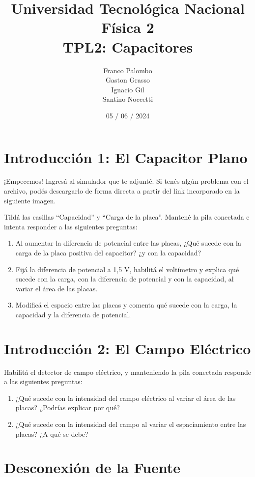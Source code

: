 \documentclass[12pt]{report}
\title{%
  \fontsize{25}{0}\selectfont Universidad Tecnológica Nacional \\
  \fontsize{22}{30}\selectfont Física 2 \\
  \fontsize{18}{25}\selectfont TPL2: Capacitores
}
\author{
  Franco Palombo\\
  Gaston Grasso\\
  Ignacio Gil\\
  Santino Noccetti\\
}
\date{05 / 06 / 2024}
\begin{document}
\maketitle

\section{Introducción 1: El Capacitor Plano}

¡Empecemos! Ingresá al simulador que te adjunté. Si tenés algún problema con el archivo, podés descargarlo de forma directa a partir del link incorporado en la siguiente imagen.

Tildá las casillas “Capacidad” y “Carga de la placa”. Mantené la pila conectada e intenta responder a las siguientes preguntas:

\begin{enumerate}
    \item Al aumentar la diferencia de potencial entre las placas, ¿Qué sucede con la carga de la placa positiva del capacitor? ¿y con la capacidad?
    \item Fijá la diferencia de potencial a 1,5 V, habilitá el voltímetro y explica qué sucede con la carga, con la diferencia de potencial y con la capacidad, al variar el área de las placas.
    \item Modificá el espacio entre las placas y comenta qué sucede con la carga, la capacidad y la diferencia de potencial.
\end{enumerate}

\section{Introducción 2: El Campo Eléctrico}

Habilitá el detector de campo eléctrico, y manteniendo la pila conectada responde a las siguientes preguntas:

\begin{enumerate}
    \item ¿Qué sucede con la intensidad del campo eléctrico al variar el área de las placas? ¿Podrías explicar por qué?
    \item ¿Qué sucede con la intensidad del campo al variar el espaciamiento entre las placas? ¿A qué se debe?
\end{enumerate}

\section{Desconexión de la Fuente}
\end{document}
